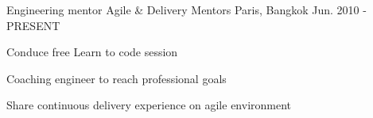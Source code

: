 

\begin{cventries}

  \cventry
    {Engineering mentor} %
    {Agile \& Delivery Mentors} %
    {Paris, Bangkok} %
    {Jun. 2010 - PRESENT} %
    {
      \begin{cvitems} %
        \item {Conduce free Learn to code session}
        \item {Coaching engineer to reach professional goals}
        \item {Share continuous delivery experience on  agile environment}
      \end{cvitems}
    }
    { } %


\end{cventries}
